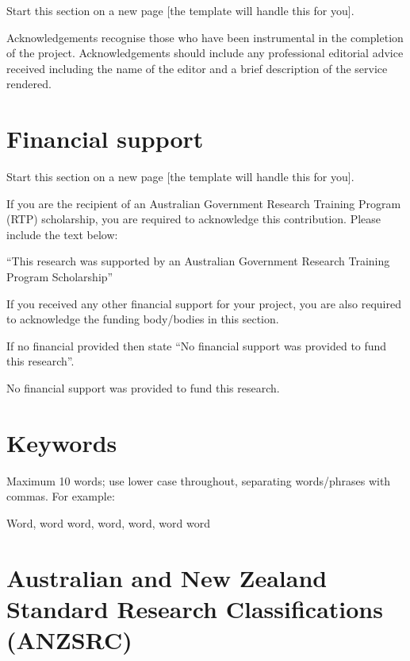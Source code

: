 \begin{instructional}
Start this section on a new page [the template will handle this for you].

Acknowledgements recognise those who have been instrumental in the completion of the project.  Acknowledgements should include any professional editorial advice received including the name of the editor and a brief description of the service rendered.
\end{instructional}

\clearpage

\section*{Financial support}

\begin{instructional}
Start this section on a new page [the template will handle this for you].

If you are the recipient of an Australian Government Research Training Program (RTP) scholarship, you are required to acknowledge this contribution.  Please include the text below:

``This research was supported by an Australian Government Research Training Program Scholarship''

If you received any other financial support for your project, you are also required to acknowledge the funding body/bodies in this section.

If no financial provided then state ``No financial support was provided to fund this research''.
\end{instructional}

No financial support was provided to fund this research.

\section*{Keywords}

\begin{instructional}
	Maximum 10 words; use lower case throughout, separating words/phrases with commas. For example:
\end{instructional}

Word, word word, word, word, word word

\section*{Australian and New Zealand Standard Research Classifications (ANZSRC)}

